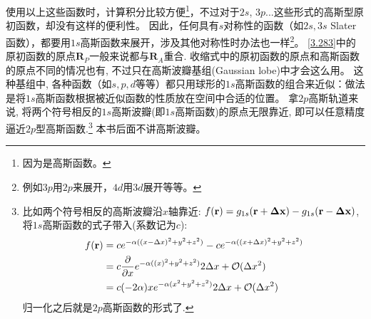 使用以上这些函数时，计算积分比较方便\footnote{因为是高斯函数。}，不过对于$2s$, $3p$...这些形式的高斯型原初函数，却没有这样的便利性。
因此，任何具有$s$对称性的函数（如$2s,3s$ Slater函数），都要用$1s$高斯函数来展开，涉及其他对称性时办法也一样\footnote{例如$3p$用$2p$来展开，$4d$用$3d$展开等等。}。
\autoref{3.283}中的原初函数的原点$\mathbf{R}_P$一般来说都与$\mathbf{R}_A$重合. 
收缩式中的原初函数的原点和高斯函数的原点不同的情况也有, 不过只在高斯波瓣基组(Gaussian lobe)中才会这么用。
这种基组中, 各种函数（如$s,p,d$等等）都只用球形的$1s$高斯函数的组合来近似：做法是将$1s$高斯函数根据被近似函数的性质放在空间中合适的位置。
拿$2p$高斯轨道来说, 将两个符号相反的$1s$高斯波瓣(即$1s$高斯函数)的原点无限靠近, 即可以任意精度逼近$2p$型高斯函数.\footnote{
	比如两个符号相反的高斯波瓣沿$x$轴靠近: $f(\mathbf{r})=g_{1s}(\mathbf{r}+\mathbf{\Delta x})-g_{1s}(\mathbf{r}-\mathbf{\Delta x})$, 
	将$1s$高斯函数的式子带入(系数记为$c$):
	\begin{align*}
		f(\mathbf{r}) & = ce^{-\alpha((x-\Delta x)^2+y^2+z^2)}-
		ce^{-\alpha((x+\Delta x)^2+y^2+z^2)}\\
		& = c\frac{\partial}{\partial x}e^{-\alpha((x)^2+y^2+z^2)}2\Delta x +\mathcal{O}(\Delta x^2)\\
		& = c(-2\alpha) xe^{-\alpha(x^2+y^2+z^2)}2\Delta x +\mathcal{O}(\Delta x^2)
	\end{align*}
	归一化之后就是$2p$高斯函数的形式了.
}
本书后面不讲高斯波瓣。


